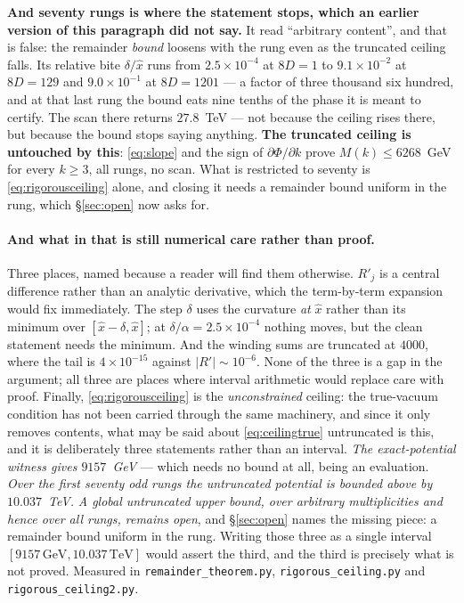 \documentclass[11pt,a4paper]{article}
\begin{document}
\noindent\textbf{And seventy rungs is where the statement stops, which an earlier version of
this paragraph did not say.} It read ``arbitrary content'', and that is false: the remainder
\emph{bound} loosens with the rung even as the truncated ceiling falls. Its relative bite
$\delta/\hat x$ runs from $2.5\times10^{-4}$ at $8D=1$ to $9.1\times10^{-2}$ at $8D=129$ and
$9.0\times10^{-1}$ at $8D=1201$ --- a factor of three thousand six hundred, and at that last rung
the bound eats nine tenths of the phase it is meant to certify. The scan there returns
$27.8$~TeV --- not because the ceiling rises there, but because the bound stops saying anything.
\textbf{The truncated ceiling is untouched by this}: \eqref{eq:slope} and the sign of
$\partial\Phi/\partial k$ prove $M(k)\le6268$~GeV for every $k\ge3$, all rungs, no scan. What is
restricted to seventy is \eqref{eq:rigorousceiling} alone, and closing it needs a remainder
bound uniform in the rung, which \S\ref{sec:open} now asks for.

\paragraph{And what in that is still numerical care rather than proof.} Three places, named because
a reader will find them otherwise. $R'_j$ is a central difference rather than an analytic
derivative, which the term-by-term expansion would fix immediately. The step $\delta$ uses the
curvature \emph{at} $\hat x$ rather than its minimum over $[\hat x-\delta,\hat x]$; at
$\delta/\alpha=2.5\times10^{-4}$ nothing moves, but the clean statement needs the minimum. And the
winding sums are truncated at $4000$, where the tail is $4\times10^{-15}$ against $|R'|\sim10^{-6}$.
None of the three is a gap in the argument; all three are places where interval arithmetic would
replace care with proof. Finally, \eqref{eq:rigorousceiling} is the \emph{unconstrained} ceiling:
the true-vacuum condition has not been carried through the same machinery, and since it only
removes contents, what may be said about \eqref{eq:ceilingtrue} untruncated is this, and it is
deliberately three statements rather than an interval. \emph{The exact-potential witness gives
$9157$~GeV} --- which needs no bound at all, being an evaluation. \emph{Over the first seventy odd
rungs the untruncated potential is bounded above by $10.037$~TeV.} \emph{A global untruncated upper
bound, over arbitrary multiplicities and hence over all rungs, remains open}, and \S\ref{sec:open}
names the missing piece: a remainder bound uniform in the rung. Writing those three as a single
interval $[9157\,\text{GeV},10.037\,\text{TeV}]$ would assert the third, and the third is precisely
what is not proved. Measured in \texttt{remainder\_\allowbreak theorem.py},
\texttt{rigorous\_\allowbreak ceiling.py} and \texttt{rigorous\_\allowbreak ceiling2.py}.
\end{document}
